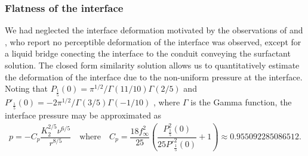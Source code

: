 \documentclass[]{jfm}
\begin{document}
\subsubsection{Flatness of the interface}

We had neglected the interface deformation motivated by the observations of \cite{Roche2014} and \cite{Mandre2017a}, who report no perceptible deformation of the interface was observed, except for a liquid bridge conecting the interface to the conduit conveying the surfactant solution.
The closed form similarity solution allows us to quantitatively estimate the deformation of the interface due to the non-uniform pressure at the interface.
Noting that $P_\frac{1}{5}(0) = \pi^{1/2}/\Gamma(11/10) \Gamma(2/5)$ and $P'_\frac{1}{5}(0) = -2 \pi^{1/2}/\Gamma(3/5)\Gamma(-1/10)$ \citep[see][\S 8.6]{Abramowitz1964}, where $\Gamma$ is the Gamma function, the interface pressure may be approximated as
\begin{align}
 p = -  C_p \dfrac{K_2^{2/5} \nu^{6/5}}{ r^{8/5}} \quad \text{where} \quad C_p = \dfrac{18 f^2_\infty}{25} \left( \dfrac{P^2_{\frac{1}{5}} (0) }{25 P'^2_\frac{1}{5}(0)} + 1 \right) \approx 0.955092285086512.
\end{align}
\end{document}
